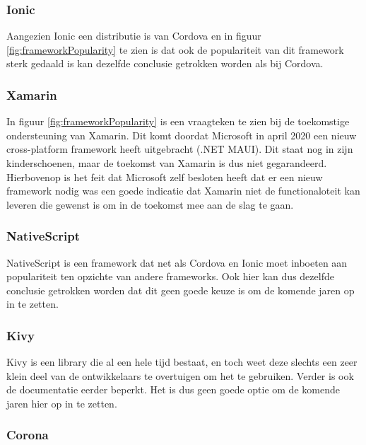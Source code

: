 \subsubsection{Ionic}
\label{subsubsec:IonicEisen}

Aangezien Ionic een distributie is van Cordova en in figuur \ref{fig:frameworkPopularity} te zien is dat ook de populariteit van dit framework sterk gedaald is kan dezelfde conclusie getrokken worden als bij Cordova.

\subsubsection{Xamarin}
\label{subsubsec:XamarinEisen}

In figuur \ref{fig:frameworkPopularity} is een vraagteken te zien bij de toekomstige ondersteuning van Xamarin. Dit komt doordat Microsoft in april 2020 een nieuw cross-platform framework heeft uitgebracht (.NET MAUI). Dit staat nog in zijn kinderschoenen, maar de toekomst van Xamarin is dus niet gegarandeerd. Hierbovenop is het feit dat Microsoft zelf besloten heeft dat er een nieuw framework nodig was een goede indicatie dat Xamarin niet de functionaloteit kan leveren die gewenst is om in de toekomst mee aan de slag te gaan.

\subsubsection{NativeScript}
\label{subsubsec:NativeScriptEisen}

NativeScript is een framework dat net als Cordova en Ionic moet inboeten aan populariteit ten opzichte van andere frameworks. Ook hier kan dus dezelfde conclusie getrokken worden dat dit geen goede keuze is om de komende jaren op in te zetten.

\subsubsection{Kivy}
\label{subsubsec:KivyEisen}

Kivy is een library die al een hele tijd bestaat, en toch weet deze slechts een zeer klein deel van de ontwikkelaars te overtuigen om het te gebruiken. Verder is ook de documentatie eerder beperkt. Het is dus geen goede optie om de komende jaren hier op in te zetten.

\subsubsection{Corona}
\label{subsubsec:CoronaEisen}


